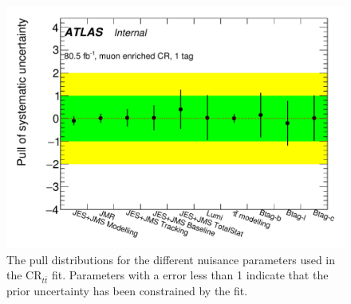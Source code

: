 \begin{figure}[!htbp]
\centering
\includegraphics[width=0.7\linewidth]{figures/backgrounds/ttbar_pulls}
\caption{The pull distributions for the different nuisance parameters used in the $\text{CR}_{t\bar{t}}$ fit. Parameters with a error less than 1 indicate that the prior uncertainty has been constrained by the fit.}
\label{sec:background:ttbar_pulls}
\end{figure}
